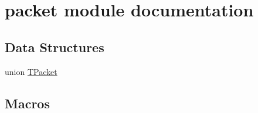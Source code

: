 \hypertarget{group__packet__module}{}\section{packet module documentation}
\label{group__packet__module}
\subsection*{Data Structures}
\begin{DoxyCompactItemize}
\item 
union \hyperlink{union_t_packet}{T\+Packet}
\end{DoxyCompactItemize}
\subsection*{Macros}

